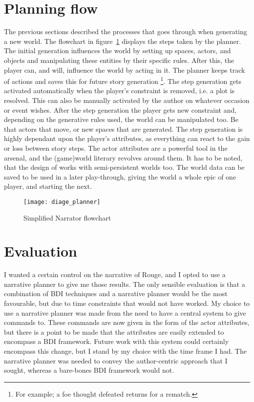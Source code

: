 \section{Planning flow}
The previous sections described the processes that \diage goes through when generating a new world.
The flowchart in figure~\ref{fig:diage_flowchart} displays the steps taken by the planner.
The initial generation influences the world by setting up spaces, actors, and objects and manipulating these entities by their specific rules.
After this, the player can, and will, influence the world by acting in it.
The planner keeps track of \his actions and saves this for future story generation \footnote{For example; a foe thought defeated returns for a rematch.}.
The step generation gets activated automatically when the player's constraint is removed, i.e.
a plot is resolved.
This can also be manually activated by the author on whatever occasion or event \he wishes.
After the step generation the player gets \his new constraint and, depending on the generative rules used, the world can be manipulated too.
Be that actors that move, or new spaces that are generated.
The step generation is highly dependant upon the player's attributes, as everything can react to the gain or loss between story steps.
The actor attributes are a powerful tool in the \diage arsenal, and the (game)world literary revolves around them.
It has to be noted, that the design of \diage works with semi-persistent worlds too.
The world data can be saved to be used in a later play-through, giving the world a whole epic of one player, and starting the next.
\begin{figure}[p]
\texttt{[image: diage\_planner]}
\caption{Simplified Narrator flowchart}\label{fig:diage_flowchart}
\end{figure}

\section{Evaluation}
I wanted a certain control on the narrative of Rouge, and I opted to use a narrative planner to give me those results.
The only sensible evaluation is that a combination of BDI techniques and a narrative planner would be the most favourable, but due to time constraints that would not have worked.
My choice to use a narrative planner was made from the need to have a central system to give commands to.
These commands are now given in the form of the actor attributes, but there is a point to be made that the attributes are easily extended to encompass a BDI framework.
Future work with this system could certainly encompass this change, but I stand by my choice with the time frame I had. 
The narrative planner was needed to convey the author-centric approach that I sought, whereas a bare-bones BDI framework would not.

